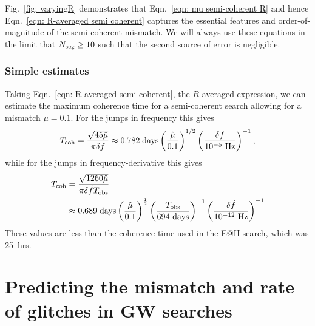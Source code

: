 \documentclass[../full_thesis/full_thesis.tex]{subfiles}
\begin{document}
Fig.~\ref{fig: varyingR} demonstrates that Eqn.~\eqref{eqn: mu semi-coherent R}
and hence Eqn.~\eqref{eqn: R-averaged semi coherent} captures the essential
features and order-of-magnitude of the semi-coherent mismatch. We will always
use these equations in the limit that $N_{\textrm{seg}} \ge 10$ such that the second source
of error is negligible.

\subsubsection{Simple estimates}
Taking Eqn.~\eqref{eqn: R-averaged semi coherent}, the $R$-averaged expression,
we can estimate the maximum coherence time
for a semi-coherent search allowing for a mismatch $\mu=0.1$. For the jumps in
frequency this gives
\begin{align}
T_{\mathrm{coh}} = \frac{\sqrt{45\hat{\mu}}}{\pi\delta f}
\approx 0.782 \;\mathrm{ days}
\left(\frac{\hat{\mu}}{0.1}\right)^{1/2}
\left(\frac{\delta f}{10^{-5}\textrm{ Hz}}\right)^{-1},
\end{align}
while for the jumps in frequency-derivative this gives
\begin{align}
\begin{split}
T_{\mathrm{coh}} & = \frac{\sqrt{1260\hat{\mu}}}{\pi\delta\dot{f}T_{\mathrm{obs}}} \\
& \approx 0.689 \;\mathrm{ days}
\left(\frac{\hat{\mu}}{0.1}\right)^{\frac{1}{2}}
\left(\frac{T_{\mathrm{obs}}}{694 \textrm{ days}}\right)^{-1}
\left(\frac{\delta\dot{f}}{10^{-12}\textrm{ Hz}}\right)^{-1}
\end{split}
\end{align}
These values are less than the coherence time used in the E@H search, which
was 25~hrs.

\section{Predicting the mismatch and rate of glitches in GW searches}
\label{sec: estimating the mismatch}
\end{document}
